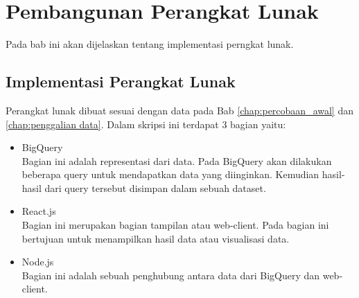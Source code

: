 \chapter{Pembangunan Perangkat Lunak}
\label{chap:pembangunan PL}
Pada bab ini akan dijelaskan tentang implementasi perngkat lunak.
\section{Implementasi Perangkat Lunak}
Perangkat lunak dibuat sesuai dengan data pada Bab \ref{chap:percobaan_awal} dan \ref{chap:penggalian data}. Dalam skripsi ini terdapat 3 bagian yaitu:
\begin{itemize}
	\item BigQuery\\
	Bagian ini adalah representasi dari data. Pada BigQuery akan dilakukan beberapa query untuk mendapatkan data yang diinginkan. Kemudian hasil-hasil dari query tersebut disimpan dalam sebuah dataset.
	\item React.js\\
	Bagian ini merupakan bagian tampilan atau web-client. Pada bagian ini bertujuan untuk menampilkan hasil data atau visualisasi data.
	\item Node.js\\
	Bagian ini adalah sebuah penghubung antara data dari BigQuery dan web-client.
\end{itemize}

